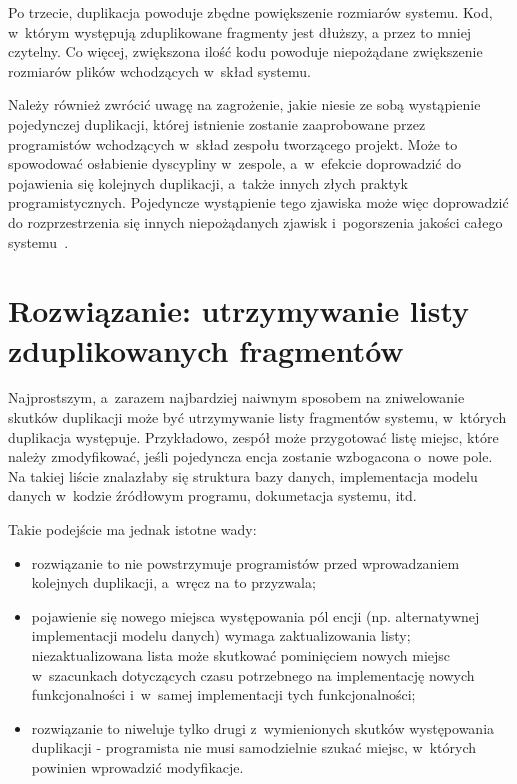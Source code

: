 Po trzecie, duplikacja powoduje zbędne powiększenie rozmiarów systemu.
Kod, w~którym występują zduplikowane fragmenty jest dłuższy, a przez to mniej czytelny.
Co więcej, zwiększona ilość kodu powoduje niepożądane zwiększenie rozmiarów plików wchodzących w~skład systemu.

Należy również zwrócić uwagę na zagrożenie, jakie niesie ze sobą wystąpienie pojedynczej duplikacji, której istnienie zostanie zaaprobowane przez programistów wchodzących w~skład zespołu tworzącego projekt.
Może to spowodować osłabienie dyscypliny w~zespole, a~w~efekcie doprowadzić do pojawienia się kolejnych duplikacji, a~także innych złych praktyk programistycznych.
Pojedyncze wystąpienie tego zjawiska może więc doprowadzić do rozprzestrzenia się innych niepożądanych zjawisk i~pogorszenia jakości całego systemu~\cite{prag_prog:entropy}.



\section{Rozwiązanie: utrzymywanie listy zduplikowanych fragmentów}

Najprostszym, a~zarazem najbardziej naiwnym sposobem na zniwelowanie skutków duplikacji może być utrzymywanie listy fragmentów systemu, w~których duplikacja występuje.
Przykładowo, zespół może przygotować listę miejsc, które należy zmodyfikować, jeśli pojedyncza encja zostanie wzbogacona o~nowe pole.
Na takiej liście znalazłaby się struktura bazy danych, implementacja modelu danych w~kodzie źródłowym programu, dokumetacja systemu, itd.

Takie podejście ma jednak istotne wady:

\begin{itemize}
 \item rozwiązanie to nie powstrzymuje programistów przed wprowadzaniem kolejnych duplikacji, a~wręcz na to przyzwala;
 \item pojawienie się nowego miejsca występowania pól encji (np. alternatywnej implementacji modelu danych) wymaga zaktualizowania listy; niezaktualizowana lista może skutkować pominięciem nowych miejsc w~szacunkach dotyczących czasu potrzebnego na implementację nowych funkcjonalności i~w~samej implementacji tych funkcjonalności;
 \item rozwiązanie to niweluje tylko drugi z~wymienionych skutków występowania duplikacji - programista nie musi samodzielnie szukać miejsc, w~których powinien wprowadzić modyfikacje.
\end{itemize}



